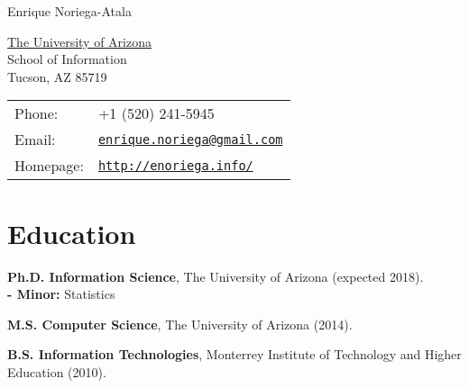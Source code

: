 \documentclass[letterpaper]{article}
\def\name{Enrique Noriega-Atala}
\renewenvironment{itemize}{
  \begin{list}{}{
    \setlength{\leftmargin}{1.5em}
  }
}{
  \end{list}
}
\begin{document}
{\huge \name}


\vspace{0.25in}

\begin{minipage}{0.45\linewidth}
  \href{http://www.unc.edu/}{The University of Arizona} \\
  School of Information \\
  Tucson, AZ 85719
\end{minipage}
\begin{minipage}{0.45\linewidth}
  \begin{tabular}{ll}
    Phone: & +1 (520) 241-5945 \\
    Email: & \href{mailto:enrique.noriega@gmail.com}{\tt enrique.noriega@gmail.com} \\
    Homepage: & \href{http://enoriega.info/}{\tt http://enoriega.info/} \\
  \end{tabular}
\end{minipage}


%


\section*{Education}

\begin{itemize}
  \item \textbf{Ph.D. Information Science}, The University of Arizona (expected 2018). \\
     \textbf{- Minor:} Statistics
  \item \textbf{M.S. Computer Science}, The University of Arizona (2014).
  \item \textbf{B.S. Information Technologies}, Monterrey Institute of Technology and Higher Education (2010).
\end{itemize}
\end{document}
